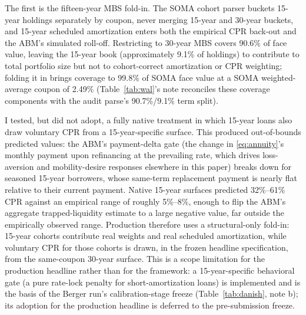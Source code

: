 \documentclass[12pt]{article}
\begin{document}
The first is the fifteen-year MBS fold-in. The SOMA cohort parser buckets 15-year holdings separately by coupon, never merging 15-year and 30-year buckets, and 15-year scheduled amortization enters both the empirical CPR back-out and the ABM's simulated roll-off. Restricting to 30-year MBS covers 90.6\% of face value, leaving the 15-year book (approximately 9.1\% of holdings) to contribute to total portfolio size but not to cohort-correct amortization or CPR weighting; folding it in brings coverage to 99.8\% of SOMA face value at a SOMA weighted-average coupon of 2.49\% (Table~\ref{tab:wal}'s note reconciles these coverage components with the audit parse's 90.7\%/9.1\% term split).

I tested, but did not adopt, a fully native treatment in which 15-year loans also draw voluntary CPR from a 15-year-specific surface. This produced out-of-bounds predicted values: the ABM's payment-delta gate (the change in \eqref{eq:annuity}'s monthly payment upon refinancing at the prevailing rate, which drives loss-aversion and mobility-desire responses elsewhere in this paper) breaks down for seasoned 15-year borrowers, whose same-term replacement payment is nearly flat relative to their current payment. Native 15-year surfaces predicted 32\%--61\% CPR against an empirical range of roughly 5\%--8\%, enough to flip the ABM's aggregate trapped-liquidity estimate to a large negative value, far outside the empirically observed range. Production therefore uses a structural-only fold-in: 15-year cohorts contribute real weights and real scheduled amortization, while voluntary CPR for those cohorts is drawn, in the frozen headline specification, from the same-coupon 30-year surface. This is a scope limitation for the production headline rather than for the framework: a 15-year-specific behavioral gate (a pure rate-lock penalty for short-amortization loans) is implemented and is the basis of the Berger run's calibration-stage freeze (Table~\ref{tab:danish}, note b); its adoption for the production headline is deferred to the pre-submission freeze.
\end{document}
